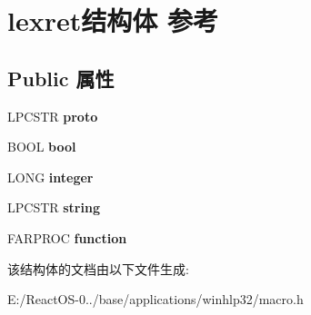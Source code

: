 \hypertarget{structlexret}{}\section{lexret结构体 参考}
\label{structlexret}
\subsection*{Public 属性}
\begin{DoxyCompactItemize}
\item 
\mbox{\label{structlexret_a988657685e7f4681f2e2849d7195753d}} 
L\+P\+C\+S\+TR {\bfseries proto}
\item 
\mbox{\label{structlexret_a75f4cce047f88db626a8ab640dc55a90}} 
B\+O\+OL {\bfseries bool}
\item 
\mbox{\label{structlexret_aad3756d2c18c2cdaf76eab52464df7cd}} 
L\+O\+NG {\bfseries integer}
\item 
\mbox{\label{structlexret_ae890ba24dfaa8e4f6032ce51097f360f}} 
L\+P\+C\+S\+TR {\bfseries string}
\item 
\mbox{\label{structlexret_a58f786363320fed834f8ec3e5b2db5bf}} 
F\+A\+R\+P\+R\+OC {\bfseries function}
\end{DoxyCompactItemize}


该结构体的文档由以下文件生成\+:\begin{DoxyCompactItemize}
\item 
E\+:/\+React\+O\+S-\/0../base/applications/winhlp32/macro.\+h\end{DoxyCompactItemize}
